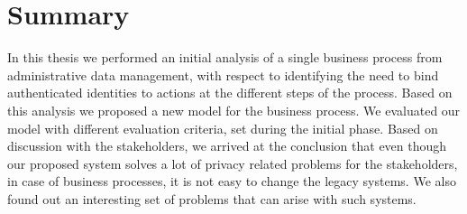 \chapter{Summary}

In this thesis we performed an initial analysis of a single business process from administrative data management, with respect to identifying the need to bind authenticated identities to actions at the different steps of the process. Based on this analysis we proposed a new model for the business process. We evaluated our model with different evaluation criteria, set during the initial phase. Based on discussion with the stakeholders, we arrived at the conclusion that even though our proposed system solves a lot of privacy related problems for the stakeholders, in case of business processes, it is not easy to change the legacy systems. We also found out an interesting set of problems that can arise with such systems.